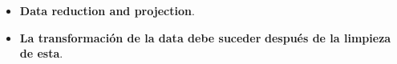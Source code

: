 \documentclass[
]{book}
\providecommand{\tightlist}{%
  \setlength{\itemsep}{0pt}\setlength{\parskip}{0pt}}
\begin{document}
\begin{enumerate}
  \begin{itemize}
  \tightlist
  \item
    \textbf{Data reduction and projection}.
  \item
    \textbf{La transformación de la data debe suceder}
    \textbf{después de la limpieza de esta}.
  \end{itemize}
\end{enumerate}

  
\end{document}
